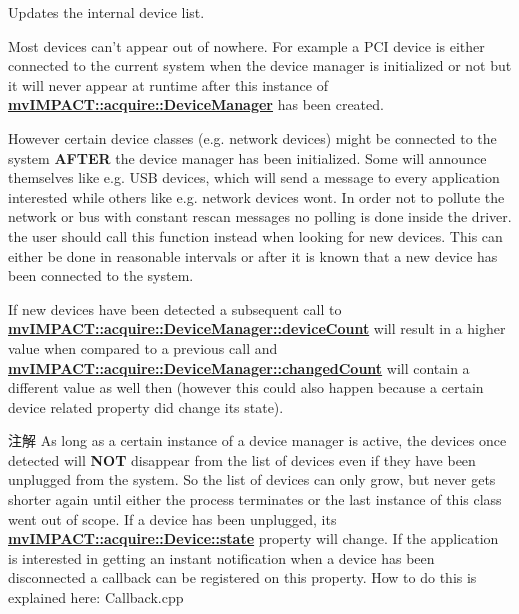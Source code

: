 Updates the internal device list. 

Most devices can't appear out of nowhere. For example a P\+C\+I device is either connected to the current system when the device manager is initialized or not but it will never appear at runtime after this instance of {\bfseries \hyperlink{classmv_i_m_p_a_c_t_1_1acquire_1_1_device_manager}{mv\+I\+M\+P\+A\+C\+T\+::acquire\+::\+Device\+Manager}} has been created.

However certain device classes (e.\+g. network devices) might be connected to the system {\bfseries A\+F\+T\+E\+R} the device manager has been initialized. Some will announce themselves like e.\+g. U\+S\+B devices, which will send a message to every application interested while others like e.\+g. network devices wont. In order not to pollute the network or bus with constant rescan messages no polling is done inside the driver. the user should call this function instead when looking for new devices. This can either be done in reasonable intervals or after it is known that a new device has been connected to the system.

If new devices have been detected a subsequent call to {\bfseries \hyperlink{classmv_i_m_p_a_c_t_1_1acquire_1_1_device_manager_a1d58b307ac5a3648cb6a0e8d5d3b37ab}{mv\+I\+M\+P\+A\+C\+T\+::acquire\+::\+Device\+Manager\+::device\+Count}} will result in a higher value when compared to a previous call and {\bfseries \hyperlink{classmv_i_m_p_a_c_t_1_1acquire_1_1_device_manager_acfff7b0dbb399008640b47de950b2b38}{mv\+I\+M\+P\+A\+C\+T\+::acquire\+::\+Device\+Manager\+::changed\+Count}} will contain a different value as well then (however this could also happen because a certain device related property did change its state).

\begin{DoxyNote}{注解}
As long as a certain instance of a device manager is active, the devices once detected will {\bfseries N\+O\+T} disappear from the list of devices even if they have been unplugged from the system. So the list of devices can only grow, but never gets shorter again until either the process terminates or the last instance of this class went out of scope. If a device has been unplugged, its {\bfseries \hyperlink{classmv_i_m_p_a_c_t_1_1acquire_1_1_device_a4861037a845148f813bc72bad7334ebd}{mv\+I\+M\+P\+A\+C\+T\+::acquire\+::\+Device\+::state}} property will change. If the application is interested in getting an instant notification when a device has been disconnected a callback can be registered on this property. How to do this is explained here\+: Callback.\+cpp 
\end{DoxyNote}


